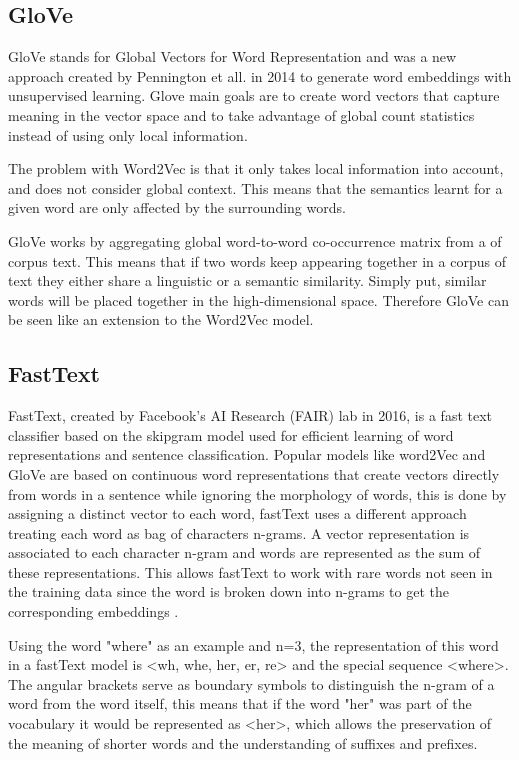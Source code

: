         
        \subsection{GloVe}
            \par GloVe stands for Global Vectors for Word Representation and was a new approach created by Pennington et all. in 2014 \cite{Pennington2014} to generate word embeddings with unsupervised learning. Glove main goals are to create word vectors that capture meaning in the vector space and to take advantage of global count statistics instead of using only local information. 
            \par The problem with Word2Vec is that it only takes local information into account, and does not consider global context. This means that the semantics learnt for a given word are only affected by the surrounding words. 
            \par GloVe works by aggregating global word-to-word co-occurrence matrix from a of corpus text. This means that if two words keep appearing together in a corpus of text they either share a linguistic or a semantic similarity. Simply put, similar words will be placed together in the high-dimensional space. Therefore GloVe can be seen like an extension to the Word2Vec model.

        \subsection{FastText}

        \par FastText, created by Facebook's AI Research (FAIR) lab in 2016, is a fast text classifier based on the skipgram model  used for efficient learning of word representations and sentence classification. Popular models like word2Vec and GloVe  are based on continuous word representations that create vectors directly from words in a sentence while ignoring the morphology of words, this is done by assigning a distinct vector to each word, fastText uses a different approach treating each word as bag of characters n-grams. A vector representation is associated to each character n-gram and words are represented as the sum of these representations. This allows fastText to work with rare words not seen in the training data since the word is broken down into n-grams to get the corresponding embeddings \cite{bojanowski2016enriching}.


        \par Using the word "where" as an example and n=3, the representation of this word in a fastText model is <wh, whe, her, er, re> and the special sequence <where>. The angular brackets serve as boundary symbols to distinguish the n-gram of a word from the word itself, this means that if the word "her" was part of the vocabulary it would be represented as <her>, which allows the preservation of the meaning of shorter words and the understanding of suffixes and prefixes.

